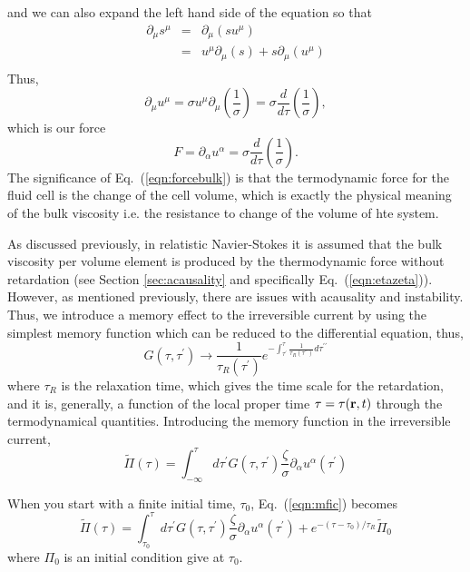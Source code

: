 \documentclass[aps,article]{revtex4}
\begin{document}
and we can also expand the left hand side of the equation so that
\begin{eqnarray}\label{eqn:spart3}
\partial_{\mu}s^{\mu}&=&\partial_{\mu}\left(su^{\mu}\right)\nonumber\\
&=&u^{\mu}\partial_{\mu}\left(s\right)+s\partial_{\mu}\left(u^{\mu}\right)\nonumber\\
\end{eqnarray}
Thus,
\begin{equation}
\partial_{\mu}u^{\mu}=\sigma u^{\mu}\partial_{\mu}\left(\frac{1}{\sigma}\right)=\sigma \frac{d}{d\tau}\left(\frac{1}{\sigma}\right),
\end{equation}
which is our force
\begin{equation}\label{eqn:forcebulk}
F=\partial_{\alpha}u^{\alpha}=\sigma\frac{d}{d\tau}\left(\frac{1}{\sigma}\right).
\end{equation}
The significance of Eq.\ (\ref{eqn:forcebulk}) is that the termodynamic force for the fluid cell is the change of the cell volume, which is exactly the physical meaning of the bulk viscosity i.e. the resistance to change of the volume of hte system.

As discussed previously, in relatistic Navier-Stokes it is assumed that the bulk viscosity per volume element is produced by the thermodynamic force without retardation (see Section \ref{sec:acausality} and specifically Eq.\ (\ref{eqn:etazeta})).  
However, as mentioned previously, there are issues with acausality and instability.  Thus, we introduce a memory effect to the irreversible current by using the simplest  memory function which can be reduced to the differential equation, thus,
\begin{equation}
G\left(\tau,\tau^{\prime}\right)\rightarrow\frac{1}{\tau_R\left(\tau^{\prime}\right)}e^{-\int_{\tau^{\prime}}^{\tau}\frac{1}{\tau_R\left(\tau^{\prime\prime}\right)}d\tau^{\prime\prime}}
\end{equation}
where $\tau_R$ is the relaxation time, which gives the time scale for the retardation, and it is, generally, a function of the local proper time $\tau=\tau({\bf r}, t)$ through the termodynamical quantities. Introducing the memory function in the irreversible current,
\begin{equation}\label{eqn:mfic}
\tilde{\Pi}(\tau)=\int_{-\infty}^{\tau}d\tau^{\prime}G\left(\tau,\tau^{\prime}\right)\frac{\zeta}{\sigma}\partial_{\alpha}u^{\alpha}\left(\tau^{\prime}\right)
\end{equation}

When you start with a finite initial time, $\tau_0$, Eq.\ (\ref{eqn:mfic}) becomes
\begin{equation}\label{eqn:mficIC}
\tilde{\Pi}(\tau)=\int_{\tau_0}^{\tau}d\tau^{\prime}G\left(\tau,\tau^{\prime}\right)\frac{\zeta}{\sigma}\partial_{\alpha}u^{\alpha}\left(\tau^{\prime}\right)+e^{-\left(\tau-\tau_0\right)/\tau_R}\tilde{\Pi}_0
\end{equation}
where $\Pi_0$ is an initial condition give at $\tau_0$. 
\end{document}
